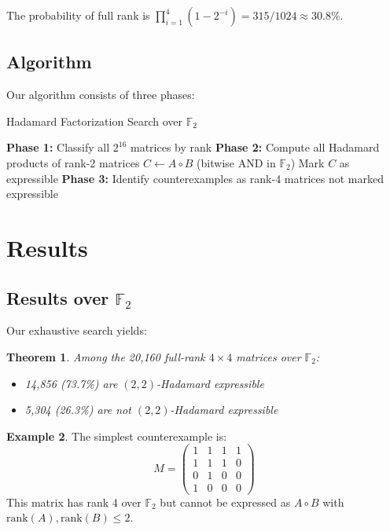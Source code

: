 \documentclass[11pt]{amsart}
\theoremstyle{plain}
\newtheorem{theorem}{Theorem}
\theoremstyle{definition}
\newtheorem{example}[theorem]{Example}
\theoremstyle{remark}
\begin{document}
The probability of full rank is $\prod_{i=1}^4 (1 - 2^{-i}) = 315/1024 \approx 30.8\%$.

\subsection{Algorithm}

Our algorithm consists of three phases:

\begin{algorithm}
\caption{Hadamard Factorization Search over $\mathbb{F}_2$}
\begin{algorithmic}[1]
\STATE \textbf{Phase 1:} Classify all $2^{16}$ matrices by rank
\STATE \textbf{Phase 2:} Compute all Hadamard products of rank-2 matrices
    \STATE $C \leftarrow A \circ B$ (bitwise AND in $\mathbb{F}_2$)
        \STATE Mark $C$ as expressible
    \ENDIF
\ENDFOR
\STATE \textbf{Phase 3:} Identify counterexamples as rank-4 matrices not marked expressible
\end{algorithmic}
\end{algorithm}

\section{Results}

\subsection{Results over $\mathbb{F}_2$}

Our exhaustive search yields:

\begin{theorem}
Among the 20,160 full-rank $4 \times 4$ matrices over $\mathbb{F}_2$:
\begin{itemize}
\item 14,856 (73.7\%) are $(2,2)$-Hadamard expressible
\item 5,304 (26.3\%) are not $(2,2)$-Hadamard expressible
\end{itemize}
\end{theorem}

\begin{example}
The simplest counterexample is:
\[
M = \begin{pmatrix}
1 & 1 & 1 & 1 \\
1 & 1 & 1 & 0 \\
0 & 1 & 0 & 0 \\
1 & 0 & 0 & 0
\end{pmatrix}
\]
This matrix has rank 4 over $\mathbb{F}_2$ but cannot be expressed as $A \circ B$ with $\mathrm{rank}(A), \mathrm{rank}(B) \leq 2$.
\end{example}
\end{document}
